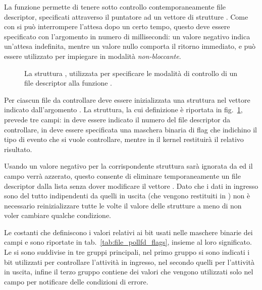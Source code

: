 La funzione permette di tenere sotto controllo contemporaneamente 
file descriptor, specificati attraverso il puntatore  ad un
vettore di strutture .  Come con  si può
interrompere l'attesa dopo un certo tempo, questo deve essere specificato con
l'argomento  in numero di millisecondi: un valore negativo
indica un'attesa indefinita, mentre un valore nullo comporta il ritorno
immediato, e può essere utilizzato per impiegare  in modalità
\textsl{non-bloccante}.

\begin{figure}[!htb]
  \footnotesize \centering
  \begin{minipage}[c]{0.90\textwidth}
  \end{minipage} 
  \normalsize 
  \caption{La struttura , utilizzata per specificare le
    modalità di controllo di un file descriptor alla funzione .}
  \label{fig:file_pollfd}
\end{figure}

Per ciascun file da controllare deve essere inizializzata una struttura
 nel vettore indicato dall'argomento .  La
struttura, la cui definizione è riportata in fig.~\ref{fig:file_pollfd},
prevede tre campi: in  deve essere indicato il numero del file
descriptor da controllare, in  deve essere specificata una
maschera binaria di flag che indichino il tipo di evento che si vuole
controllare, mentre in  il kernel restituirà il relativo
risultato. 

Usando un valore negativo per  la corrispondente struttura sarà
ignorata da  ed il campo  verrà azzerato, questo
consente di eliminare temporaneamente un file descriptor dalla lista senza
dover modificare il vettore . Dato che i dati in ingresso sono del
tutto indipendenti da quelli in uscita (che vengono restituiti in
) non è necessario reinizializzare tutte le volte il valore delle
strutture  a meno di non voler cambiare qualche condizione.

Le costanti che definiscono i valori relativi ai bit usati nelle maschere
binarie dei campi  e  sono riportate in
tab.~\ref{tab:file_pollfd_flags}, insieme al loro significato. Le si sono
suddivise in tre gruppi principali, nel primo gruppo si sono indicati i bit
utilizzati per controllare l'attività in ingresso, nel secondo quelli per
l'attività in uscita, infine il terzo gruppo contiene dei valori che vengono
utilizzati solo nel campo  per notificare delle condizioni di
errore.


